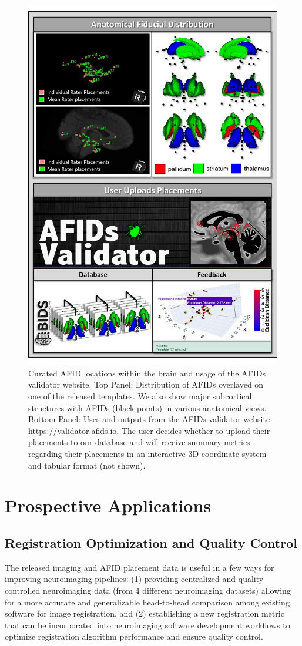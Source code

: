 \begin{figure}
    \centering
    \includegraphics[width=0.9\linewidth]{figs/ch2_Figure_2.pdf}
    \caption{Curated AFID locations within the brain and usage of the AFIDs validator website. Top Panel: Distribution of AFIDs overlayed on one of the released templates. We also show major subcortical structures with AFIDs (black points) in various anatomical views. Bottom Panel: Uses and outputs from the AFIDs validator website \url{https://validator.afids.io}. The user decides whether to upload their placements to our database and will receive summary metrics regarding their placements in an interactive 3D coordinate system and tabular format (not shown).}
    \label{fig:ch2_Figure_2}
\end{figure}

\section{Prospective Applications}
\subsection{Registration Optimization and Quality Control}
The released imaging and AFID placement data is useful in a few ways for improving neuroimaging pipelines: (1) providing centralized and quality controlled neuroimaging data (from 4 different neuroimaging datasets) allowing for a more accurate and generalizable head-to-head comparison among existing software for image registration, and (2) establishing a new registration metric that can be incorporated into neuroimaging software development workflows to optimize registration algorithm performance and ensure quality control.

